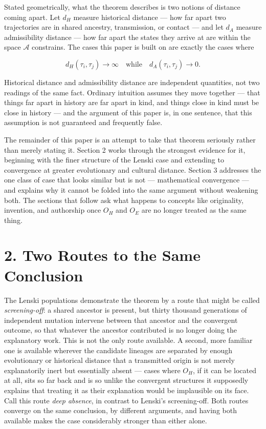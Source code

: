 \documentclass[11pt]{article}
\theoremstyle{plain}
\begin{document}
Stated geometrically, what the theorem describes is two notions of distance coming apart. Let \(d_H\) measure historical distance --- how far apart two trajectories are in shared ancestry, transmission, or contact --- and let \(d_A\) measure admissibility distance --- how far apart the states they arrive at are within the space \(\mathcal{A}\) constrains. The cases this paper is built on are exactly the cases where

\[
d_H(\tau_i, \tau_j) \to \infty \quad \text{while} \quad d_A(\tau_i, \tau_j) \to 0.
\]

Historical distance and admissibility distance are independent quantities, not two readings of the same fact. Ordinary intuition assumes they move together --- that things far apart in history are far apart in kind, and things close in kind must be close in history --- and the argument of this paper is, in one sentence, that this assumption is not guaranteed and frequently false.

The remainder of this paper is an attempt to take that theorem seriously rather than merely stating it. Section 2 works through the strongest evidence for it, beginning with the finer structure of the Lenski case and extending to convergence at greater evolutionary and cultural distance. Section 3 addresses the one class of case that looks similar but is not --- mathematical convergence --- and explains why it cannot be folded into the same argument without weakening both. The sections that follow ask what happens to concepts like originality, invention, and authorship once \(O_H\) and \(O_E\) are no longer treated as the same thing.

\section*{2. Two Routes to the Same Conclusion}

The Lenski populations demonstrate the theorem by a route that might be called \emph{screening-off}: a shared ancestor is present, but thirty thousand generations of independent mutation intervene between that ancestor and the convergent outcome, so that whatever the ancestor contributed is no longer doing the explanatory work. This is not the only route available. A second, more familiar one is available wherever the candidate lineages are separated by enough evolutionary or historical distance that a transmitted origin is not merely explanatorily inert but essentially absent --- cases where \(O_H\), if it can be located at all, sits so far back and is so unlike the convergent structures it supposedly explains that treating it as their explanation would be implausible on its face. Call this route \emph{deep absence}, in contrast to Lenski's screening-off. Both routes converge on the same conclusion, by different arguments, and having both available makes the case considerably stronger than either alone.
\end{document}
